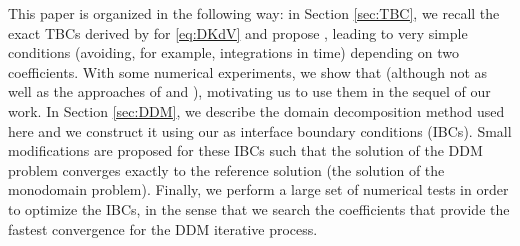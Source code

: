 \indent This paper is organized in the following way: in Section \ref{sec:TBC}, we recall the exact TBCs derived by \cite{zheng2008} for \eqref{eq:DKdV} and propose  , leading to very simple  conditions (avoiding, for example, integrations in time) depending on two coefficients. With some numerical experiments, we show that   (although not as well as the approaches of \cite{zheng2008} and \cite{besse2015}), motivating us to use them in the sequel of our work. In Section \ref{sec:DDM}, we describe the domain decomposition method used here and we construct it using our  as interface boundary conditions (IBCs). Small modifications are proposed for these IBCs such that the solution of the DDM problem converges exactly to the reference solution (the solution of the monodomain problem). Finally, we perform a large set of numerical tests in order to optimize the IBCs, in the sense that we search the coefficients that provide the fastest convergence for the DDM iterative process.